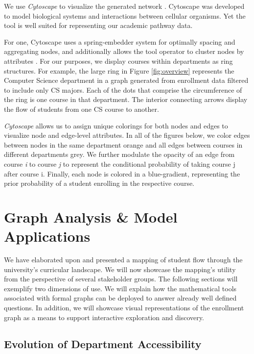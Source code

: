 \documentclass{sigchi}
\begin{document}
We use \textit{Cytoscape} to visualize the generated network
\cite{shannon2003cytoscape}. Cytoscape was developed to model
biological systems and interactions between cellular organisms. Yet
the tool is well suited for representing our academic pathway
data.

For one, Cytoscape uses a spring-embedder system for optimally spacing
and aggregating nodes, and additionally allows the tool operator to
cluster nodes by attributes \cite{Battista1994}. For our purposes, we
display courses within departments as ring structures. For example, the
large ring in Figure \ref{fig:overview} represents the Computer
Science department in a graph generated from enrollment data filtered
to include only CS majors. Each of the dots that comprise the circumference of the ring
is one course in that department. The interior connecting arrows
display the flow of students from one CS course to another.

{\em Cytoscape} allows us to assign unique colorings for both nodes
and edges to visualize node and edge-level attributes. In all of the
figures below, we color edges between nodes in the same department
orange and all edges between courses in different departments grey. We
further modulate the opacity of an edge from course \textit{i} to
course \textit{j} to represent the conditional probability of
taking course j after course i. Finally, each node is colored in a
blue-gradient, representing the prior probability of a student enrolling in the respective course.

\section{Graph Analysis \& Model Applications}
\label{sec:analysis}
We have elaborated upon and presented a mapping of student flow through the
university's curricular landscape. We will now showcase the mapping's utility from the perspective of several stakeholder groups. The following sections will exemplify two dimensions of use. We will explain how the mathematical tools associated with formal graphs can be deployed to answer already well defined questions. In addition, we will showcase visual representations of the enrollment graph as a means to support interactive exploration and discovery. 

\subsection{Evolution of Department Accessibility}
\label{sec:course_pref_evolution}
\end{document}
